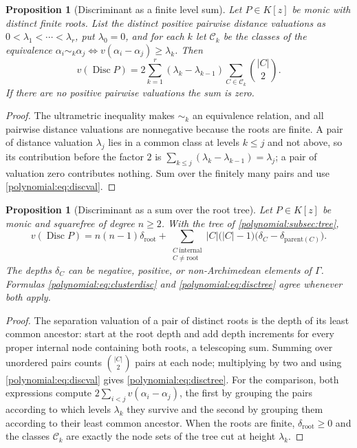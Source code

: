 \documentclass[11pt,letterpaper]{article}
\numberwithin{equation}{section}
\newtheorem{proposition}[theorem]{Proposition}
\theoremstyle{definition}
\theoremstyle{remark}\newtheorem{remark}[theorem]{Remark}
\newcommand{\Disc}{\operatorname{Disc}}
\begin{document}
\begin{proposition}[Discriminant as a finite level sum]\label{polynomial:prop:clusterdisc}
Let $P\in K[z]$ be monic with distinct finite roots. List the distinct
positive pairwise distance valuations as $0<\lambda_1<\cdots<\lambda_r$, put
$\lambda_0=0$, and for each $k$ let $\mathcal C_k$ be the classes of the
equivalence $\alpha_i\sim_k\alpha_j\iff v(\alpha_i-\alpha_j)\ge\lambda_k$.
Then
\begin{equation}\label{polynomial:eq:clusterdisc}
 v(\Disc P)=2\sum_{k=1}^r(\lambda_k-\lambda_{k-1})
 \sum_{C\in\mathcal C_k}\binom{|C|}{2}.
\end{equation}
If there are no positive pairwise valuations the sum is zero.
\end{proposition}
\begin{proof}
The ultrametric inequality makes $\sim_k$ an equivalence relation, and all
pairwise distance valuations are nonnegative because the roots are finite. A
pair of distance valuation $\lambda_j$ lies in a common class at levels
$k\le j$ and not above, so its contribution before the factor $2$ is
$\sum_{k\le j}(\lambda_k-\lambda_{k-1})=\lambda_j$; a pair of valuation zero
contributes nothing. Sum over the finitely many pairs and use
\eqref{polynomial:eq:discval}.
\end{proof}

\begin{proposition}[Discriminant as a sum over the root tree]
\label{polynomial:prop:disctree}
Let $P\in K[z]$ be monic and squarefree of degree $n\ge2$. With the tree of
\cref{polynomial:subsec:tree},
\begin{equation}\label{polynomial:eq:disctree}
 v(\Disc P)=n(n-1)\delta_{\mathrm{root}}
 +\sum_{\substack{C\ \text{internal}\\ C\ne\mathrm{root}}}
 |C|\bigl(|C|-1\bigr)\bigl(\delta_C-\delta_{\mathrm{parent}(C)}\bigr).
\end{equation}
The depths $\delta_C$ can be negative, positive, or non-Archimedean elements
of $\Gamma$. Formulas \eqref{polynomial:eq:clusterdisc} and
\eqref{polynomial:eq:disctree} agree whenever both apply.
\end{proposition}
\begin{proof}
The separation valuation of a pair of distinct roots is the depth of its least
common ancestor: start at the root depth and add depth increments for every
proper internal node containing both roots, a telescoping sum. Summing over
unordered pairs counts $\binom{|C|}{2}$ pairs at each node; multiplying by two
and using \eqref{polynomial:eq:discval} gives
\eqref{polynomial:eq:disctree}. For the comparison, both expressions compute
$2\sum_{i<j}v(\alpha_i-\alpha_j)$, the first by grouping the pairs according
to which levels $\lambda_k$ they survive and the second by grouping them
according to their least common ancestor. When the roots are finite,
$\delta_{\mathrm{root}}\ge0$ and the classes $\mathcal C_k$ are exactly the
node sets of the tree cut at height $\lambda_k$.
\end{proof}
\end{document}
